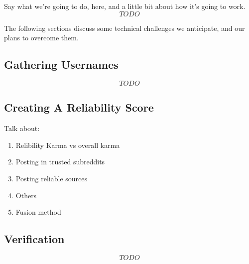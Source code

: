 Say what we're going to do, here, and a little bit about how it's going to work.
\[TODO\]

The following sections discuss some technical challenges we anticipate, and our
plans to overcome them.

\subsection{Gathering Usernames}
\label{sub:gathering_usernames}
\[TODO\]

\subsection{Creating A Reliability Score}
\label{sub:creating_a_reliability_score}
Talk about:
\begin{enumerate}
    \item Relibility Karma vs overall karma
    \item Posting in trusted subreddits
    \item Posting reliable sources
    \item Others
    \item Fusion method
\end{enumerate}

\subsection{Verification} %
\label{sub:verification}
\[TODO\]

